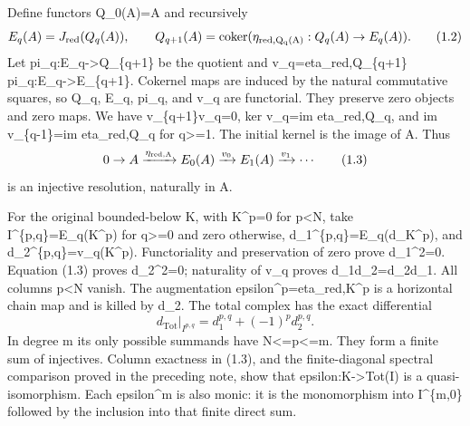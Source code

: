 \documentclass[11pt]{article}
\begin{document}
Define functors Q\_\allowbreak{}0(A)\allowbreak{}\allowbreak{}=A and recursively \[
 E_q(A)=J_{\rm red}(Q_q(A)),\qquad
 Q_{q+1}(A)=\operatorname{coker}
       (\eta_{\rm red,Q_q(A)}:Q_q(A)\to E_q(A)).
                                                               \tag{1.2}
\] Let pi\_\allowbreak{}q:\allowbreak{}E\_\allowbreak{}q\allowbreak{}->Q\_\allowbreak{}\{q\allowbreak{}+1\} be the quotient and v\_\allowbreak{}q\allowbreak{}=eta\_\allowbreak{}red,\allowbreak{}Q\_\allowbreak{}\{q\allowbreak{}+1\} pi\_\allowbreak{}q:\allowbreak{}E\_\allowbreak{}q\allowbreak{}->E\_\allowbreak{}\{q\allowbreak{}+1\}. Cokernel maps are induced by the natural commutative squares,\allowbreak{} so Q\_\allowbreak{}q,\allowbreak{} E\_\allowbreak{}q,\allowbreak{} pi\_\allowbreak{}q,\allowbreak{} and v\_\allowbreak{}q are functorial. They preserve zero objects and zero maps. We have v\_\allowbreak{}\{q\allowbreak{}+1\}v\_\allowbreak{}q\allowbreak{}=0,\allowbreak{} ker v\_\allowbreak{}q\allowbreak{}=im eta\_\allowbreak{}red,\allowbreak{}Q\_\allowbreak{}q,\allowbreak{} and im v\_\allowbreak{}\{q-1\}\allowbreak{}=im eta\_\allowbreak{}red,\allowbreak{}Q\_\allowbreak{}q for q>\allowbreak{}=1. The initial kernel is the image of A. Thus \[
 0\to A\xrightarrow{\eta_{\rm red,A}}E_0(A)
     \xrightarrow{v_0}E_1(A)\xrightarrow{v_1}\cdots             \tag{1.3}
\] is an injective resolution,\allowbreak{} naturally in A.

For the original bounded-below K,\allowbreak{} with K\textasciicircum{}p\allowbreak{}=0 for p<N,\allowbreak{} take I\textasciicircum{}\{p,\allowbreak{}q\}\allowbreak{}=E\_\allowbreak{}q(K\textasciicircum{}p)\allowbreak{} for q>\allowbreak{}=0 and zero otherwise,\allowbreak{} d\_\allowbreak{}1\textasciicircum{}\{p,\allowbreak{}q\}\allowbreak{}=E\_\allowbreak{}q(d\_\allowbreak{}K\textasciicircum{}p)\allowbreak{},\allowbreak{} and d\_\allowbreak{}2\textasciicircum{}\{p,\allowbreak{}q\}\allowbreak{}=v\_\allowbreak{}q(K\textasciicircum{}p)\allowbreak{}. Functoriality and preservation of zero prove d\_\allowbreak{}1\textasciicircum{}2\allowbreak{}=0. Equation (1.3)\allowbreak{} proves d\_\allowbreak{}2\textasciicircum{}2\allowbreak{}=0; naturality of v\_\allowbreak{}q proves d\_\allowbreak{}1d\_\allowbreak{}2\allowbreak{}=d\_\allowbreak{}2d\_\allowbreak{}1. All columns p\textless N vanish. The augmentation epsilon\textasciicircum{}p\allowbreak{}=eta\_\allowbreak{}red,\allowbreak{}K\textasciicircum{}p is a horizontal chain map and is killed by d\_\allowbreak{}2. The total complex has the exact differential \[
 d_{\operatorname{Tot}}|_{I^{p,q}}=d_1^{p,q}+(-1)^p d_2^{p,q}.
                                                               \tag{1.4}
\] In degree m its only possible summands have N<\allowbreak{}=p<\allowbreak{}=m. They form a finite sum of injectives. Column exactness in (1.3)\allowbreak{},\allowbreak{} and the finite-diagonal spectral comparison proved in the preceding note,\allowbreak{} show that epsilon:\allowbreak{}K\allowbreak{}->Tot(I)\allowbreak{} is a quasi-isomorphism. Each epsilon\^{}m is also monic:\allowbreak{} it is the monomorphism into I\textasciicircum{}\{m,\allowbreak{}0\} followed by the inclusion into that finite direct sum.
\end{document}
